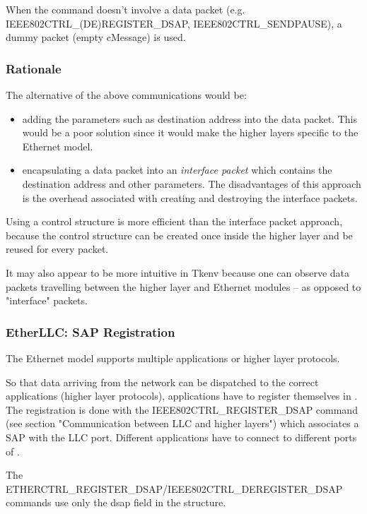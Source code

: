 When the command doesn't involve a data packet (e.g.
IEEE802CTRL\_(DE)REGISTER\_DSAP, IEEE802CTRL\_SENDPAUSE), a dummy packet
(empty cMessage) is used.

\subsubsection{Rationale}

The alternative of the above communications would be:

\begin{itemize}
  \item adding the parameters such as destination address into the data
    packet. This would be a poor solution since it would make the
    higher layers specific to the Ethernet model.
  \item encapsulating a data packet into an \textit{interface packet} which
    contains the destination address and other parameters. The
    disadvantages of this approach is the overhead associated with
    creating and destroying the interface packets.
\end{itemize}

Using a control structure is more efficient than the interface packet
approach, because the control structure can be created once inside
the higher layer and be reused for every packet.

It may also appear to be more intuitive in Tkenv because one can observe
data packets travelling between the higher layer and Ethernet
modules -- as opposed to "interface" packets.


\subsubsection{EtherLLC: SAP Registration}

The Ethernet model supports multiple applications or higher layer
protocols.

So that data arriving from the network can be dispatched to the
correct applications (higher layer protocols), applications
have to register themselves in . The registration
is done with the IEEE802CTRL\_REGISTER\_DSAP command
(see section "Communication between LLC and higher layers")
which associates a SAP with the LLC port. Different applications
have to connect to different ports of .

The ETHERCTRL\_REGISTER\_DSAP/IEEE802CTRL\_DEREGISTER\_DSAP commands use only the
dsap field in the  structure.

\fi


